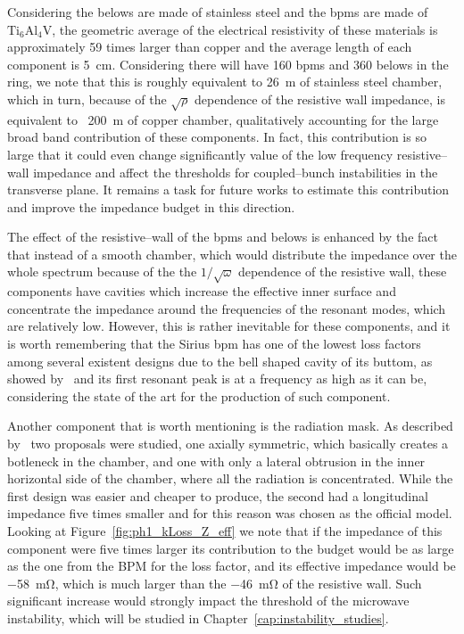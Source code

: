     Considering the belows are made of stainless steel and the \glspl{bpm} are made of $\text{Ti}_\text{6}\text{Al}_\text{4}\text{V}$, the geometric average of the electrical resistivity of these materials is approximately \num{59} times larger than copper and the average length of each component is \SI{5}{\centi\meter}. Considering there will have \num{160} \glspl{bpm} and \num{360} belows in the ring, we note that this is roughly equivalent to \SI{26}{\meter} of stainless steel chamber, which in turn, because of the $\sqrt{\rho}$ dependence of the resistive wall impedance, is equivalent to ~\SI{200}{\meter} of copper chamber, qualitatively accounting for the large broad band contribution of these components. In fact, this contribution is so large that it could even change significantly value of the low frequency resistive--wall impedance and affect the thresholds for coupled--bunch instabilities in the transverse plane. It remains a task for future works to estimate this contribution and improve the impedance budget in this direction.

    The effect of the resistive--wall of the \glspl{bpm} and belows is enhanced by the fact that instead of a smooth chamber, which would distribute the impedance over the whole spectrum because of the the $1/\sqrt{\omega}$ dependence of the resistive wall, these components have cavities which increase the effective inner surface and concentrate the impedance around the frequencies of the resonant modes, which are relatively low. However, this is rather inevitable for these components, and it is worth remembering that the Sirius \gls{bpm} has one of the lowest loss factors among several existent designs due to the bell shaped cavity of its buttom, as showed by~ and its first resonant peak is at a frequency as high as it can be, considering the state of the art for the production of such component.

    Another component that is worth mentioning is the radiation mask. As described by~ two proposals were studied, one axially symmetric, which basically creates a botleneck in the chamber, and one with only a lateral obtrusion in the inner horizontal side of the chamber, where all the radiation is concentrated. While the first design was easier and cheaper to produce, the second had a longitudinal impedance five times smaller and for this reason was chosen as the official model. Looking at Figure~\ref{fig:ph1_kLoss_Z_eff} we note that if the impedance of this component were five times larger its contribution to the budget would be as large as the one from the BPM for the loss factor, and its effective impedance would be \SI{-58}{\milli\ohm}, which is much larger than the \SI{-46}{\milli\ohm} of the resistive wall. Such significant increase would strongly impact the threshold of the microwave instability, which will be studied in Chapter~\ref{cap:instability_studies}.

